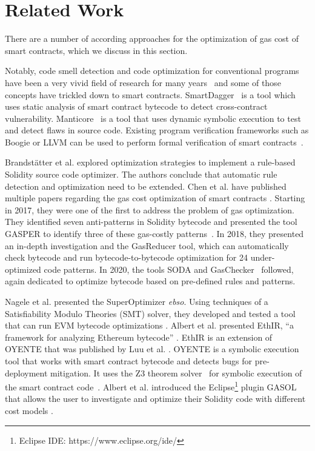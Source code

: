\documentclass[10pt,conference]{IEEEtran}
\begin{document}
	\section{Related Work}
	\label{sec:related}
	
	There are a number of according approaches for the optimization of gas cost of smart contracts, which we discuss in this section.
	
	Notably, code smell detection and code optimization for conventional programs have been a very vivid field of research for many years~\cite{codesmellmining} and some of those concepts have trickled down to smart contracts. SmartDagger~\cite{smartdagger} is a tool which uses static analysis of smart contract bytecode to detect cross-contract vulnerability. Manticore~\cite{manticore} is a tool that uses dynamic symbolic execution to test and detect flaws in source code. Existing program verification frameworks such as Boogie or LLVM can be used to perform formal verification of smart contracts~\cite{formalverification}.
	
	
	Brandstätter et al. \cite{brandstatter} explored optimization strategies to implement a rule-based Solidity source code optimizer. The authors conclude that automatic rule detection and optimization need to be extended. Chen et al. have published multiple papers regarding the gas cost optimization of smart contracts \cite{chen1devour, chen2gaschecker, chen3soda, chen4stan}. Starting in 2017, they were one of the first to address the problem of gas optimization. They identified seven anti-patterns in Solidity bytecode and presented the tool GASPER to identify three of these gas-costly patterns~\cite{chen1devour}. In 2018, they presented an in-depth investigation and the GasReducer tool, which can automatically check bytecode and run bytecode-to-bytecode optimization for 24 under-optimized code patterns. In 2020, the tools SODA \cite{chen3soda} and GasChecker~\cite{chen2gaschecker} followed, again dedicated to optimize bytecode based on pre-defined rules and patterns. 
	
	Nagele et al. presented the SuperOptimizer \textit{ebso}. Using techniques of a Satisfiability Modulo Theories (SMT) solver, they developed and tested a tool that can run EVM bytecode optimizations \cite{nagele}. Albert et al. presented EthIR, ``a framework for analyzing Ethereum bytecode'' \cite{ethir}. EthIR is an extension of OYENTE that was published by Luu et al. \cite{oyente}. OYENTE is a symbolic execution tool that works with smart contract bytecode and detects bugs for pre-deployment mitigation. It uses the Z3 theorem solver~\cite{z3solver} for symbolic execution of the smart contract code~\cite{oyente}. Albert et al. introduced the Eclipse\footnote{Eclipse IDE: https://www.eclipse.org/ide/} plugin GASOL that allows the user to investigate and optimize their Solidity code with different cost models \cite{gasol}.
	
\end{document}
